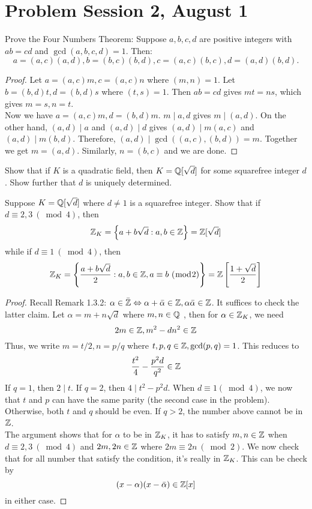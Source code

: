 \documentclass[12pt,twoside=semi,openright,numbers=noenddot]{scrbook}
\begin{document}
\section{Problem Session 2, August 1}
\begin{problem}
    Prove the Four Numbers Theorem: Suppose $a, b, c, d$ are positive integers with $ab = cd$ and $\gcd(a, b, c, d) = 1$. 
    Then: 
    $$ a = (a, c)(a, d), b = (b, c)(b, d), c = (a, c)(b, c), d = (a, d)(b, d). $$
\end{problem}
    \begin{proof}
        Let $a = (a,c)m , c = (a, c)n$ where $(m,n) = 1$. Let $b = (b,d)t, d=(b,d)s$ where $(t,s)=1$.
        Then $ab=cd$ gives $mt=ns$, which gives $m=s, n=t$. \\ 
        Now we have $a = (a,c)m, d =(b,d)m$. $m \mid a, d$ gives $m \mid (a,d)$. On the other hand, 
        $(a,d) \mid a$ and $(a,d)\mid d$ gives $(a,d) \mid m(a,c)$ and $(a,d) \mid m(b,d)$. 
        Therefore, $(a,d)\mid \gcd((a,c),(b,d)) = m$. Together we get $m = (a,d)$. Similarly, $n = (b,c)$ and 
        we are done.
    \end{proof}

\begin{problem}
    Show that if $K$ is a quadratic field, then $K = \mathbb Q[\sqrt{d}]$ for some squarefree integer $d$.
    Show further that $d$ is uniquely determined.
\end{problem}

\begin{problem}
    Suppose $K = \mathbb Q[\sqrt{d}]$ where $d \neq 1$ is a squarefree integer. Show that if $d \equiv 2,3 \ (\bmod 4)$, 
    then 
    $$\mathbb Z_K = \left\{a+b\sqrt{d}:a,b \in \mathbb Z\right\} = \mathbb Z[\sqrt{d}]$$
    while if $d \equiv 1 \ (\bmod 4)$, then
    $$\mathbb Z_K = \left\{\frac{a+b\sqrt{d}}{2}:a,b\in \mathbb Z, a\equiv b \ (\bmod 2)\right\} = \mathbb Z\left[\frac{1+\sqrt{d}}{2}\right]$$
\end{problem}
    \begin{proof}
        Recall Remark 1.3.2: $\alpha \in \bar{\mathbb Z} \Leftrightarrow \alpha + \bar{\alpha} \in \mathbb Z, \alpha\bar{\alpha}\in \mathbb Z$.
        It suffices to check the latter claim. Let $\alpha = m+n\sqrt{d}$ where $m, n \in \mathbb Q$
        , then for $\alpha\in \mathbb Z_K$, we need
        $$2m \in \mathbb Z, m^2-dn^2 \in \mathbb Z$$
        Thus, we write $m = t/2, n = p/q$ where $t, p, q \in \mathbb Z, \gcd(p,q) = 1$.
        This reduces to 
        $$ \frac{t^2}{4}-\frac{p^2d}{q^2} \in \mathbb Z$$
        If $q = 1$, then $2\mid t$.
        If $q = 2$, then $4 \mid t^2-p^2d$. When $d \equiv 1 (\bmod 4)$, we now that 
        $t$ and $p$ can have the same parity (the second case in the problem). Otherwise, both 
        $t$ and $q$ should be even. If $q > 2$, the number above cannot be in $\mathbb Z$. \\ 
        The argument shows that for $\alpha$ to be in $\mathbb Z_K$, it has to satisfy $m, n \in \mathbb Z$ when $d \equiv 2,3 \ (\bmod 4)$ and 
        $2m, 2n \in \mathbb Z$ where $2m \equiv 2n \ (\bmod 2)$. We now check that for all number that satisfy the condition, 
        it's really in $\mathbb Z_K$. This can be check by 
        $$(x-\alpha)(x-\bar{\alpha}) \in \mathbb Z[x]$$
        in either case.
    \end{proof}
\end{document}
